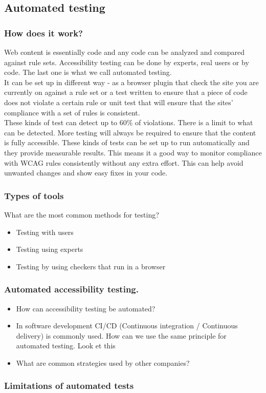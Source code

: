 \documentclass{master_thesis_section}
\begin{document}
\subsection{Automated testing}
\subsubsection{How does it work?}

Web content is essentially code and any code can be analyzed and compared against rule sets. Accessibility testing can be done by experts, real users or by code. The last one is what we call automated testing. \\
It can be set up in different way - as a browser plugin that check the site you are currently on against a rule set or a test written to ensure that a piece of code does not violate a certain rule or unit test that will ensure that the sites' compliance with a set of rules is consistent. \\
These kinds of test can detect up to 60\% of violations.
There is a limit to what can be detected. More testing will always be required to ensure that the content is fully accessible. These kinds of tests can be set up to run automatically and they provide measurable results. This means it a good way to monitor compliance with WCAG rules consistently without any extra effort. This can help avoid unwanted changes and show easy fixes in  your code.

\subsubsection{Types of tools}

\citep{Sane2021}
\citep{AbouZahra2017}
\citep{AbouZahra2020}
\citep{Alsaeedi2020}
\citep{WebAIM2019}
What are the most common methods for testing?

\begin{itemize}
	\item Testing with users
	\item Testing using experts
	\item Testing by using checkers that run in a browser
\end{itemize}
\subsubsection{Automated accessibility testing.}

\begin{itemize}
	\item How can accessibility testing be automated?
	\item In software development CI/CD (Continuous integration / Continuous delivery) is commonly used. How can we use the same principle for automated testing. Look et this \citep{}
	\item What are common strategies used by other companies?
\end{itemize}

\subsubsection{Limitations of automated tests}
\end{document}
